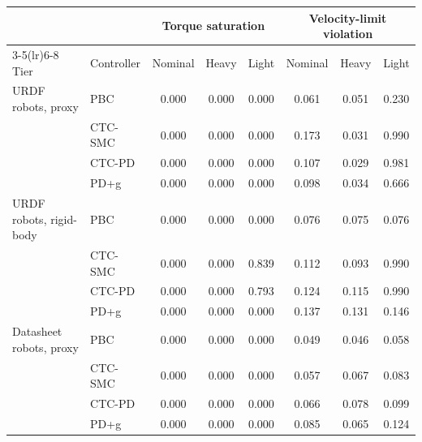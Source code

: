 \begin{tabular}{llcccccc}
\toprule
& & \multicolumn{3}{c}{Torque saturation} & \multicolumn{3}{c}{Velocity-limit violation} \\
\cmidrule(lr){3-5}\cmidrule(lr){6-8}
Tier & Controller & Nominal & Heavy & Light & Nominal & Heavy & Light \\
\midrule
URDF robots, proxy       & PBC     & 0.000 & 0.000 & 0.000 & 0.061 & 0.051 & 0.230 \\
                         & CTC-SMC & 0.000 & 0.000 & 0.000 & 0.173 & 0.031 & 0.990 \\
                         & CTC-PD  & 0.000 & 0.000 & 0.000 & 0.107 & 0.029 & 0.981 \\
                         & PD+g    & 0.000 & 0.000 & 0.000 & 0.098 & 0.034 & 0.666 \\
\midrule
URDF robots, rigid-body  & PBC     & 0.000 & 0.000 & 0.000 & 0.076 & 0.075 & 0.076 \\
                         & CTC-SMC & 0.000 & 0.000 & 0.839 & 0.112 & 0.093 & 0.990 \\
                         & CTC-PD  & 0.000 & 0.000 & 0.793 & 0.124 & 0.115 & 0.990 \\
                         & PD+g    & 0.000 & 0.000 & 0.000 & 0.137 & 0.131 & 0.146 \\
\midrule
Datasheet robots, proxy  & PBC     & 0.000 & 0.000 & 0.000 & 0.049 & 0.046 & 0.058 \\
                         & CTC-SMC & 0.000 & 0.000 & 0.000 & 0.057 & 0.067 & 0.083 \\
                         & CTC-PD  & 0.000 & 0.000 & 0.000 & 0.066 & 0.078 & 0.099 \\
                         & PD+g    & 0.000 & 0.000 & 0.000 & 0.085 & 0.065 & 0.124 \\
\bottomrule
\end{tabular}
